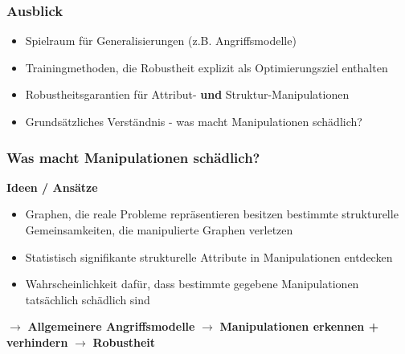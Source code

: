 \documentclass{beamer}
\begin{document}
\begin{frame}
  \frametitle{Ausblick}

  \begin{itemize}
    \item Spielraum für Generalisierungen (z.B. Angriffsmodelle)
    \item Trainingmethoden, die Robustheit explizit als Optimierungsziel enthalten
    \item Robustheitsgarantien für Attribut- \textbf{und} Struktur-Manipulationen
    \item Grundsätzliches Verständnis - was macht Manipulationen schädlich?
  \end{itemize}
\end{frame}

\begin{frame}
  \frametitle{Was macht Manipulationen schädlich?}

  \textbf{Ideen / Ansätze}
  \begin{itemize}
    \item Graphen, die reale Probleme repräsentieren besitzen bestimmte strukturelle Gemeinsamkeiten, die manipulierte Graphen verletzen
    \item Statistisch signifikante strukturelle Attribute in Manipulationen entdecken
    \item Wahrscheinlichkeit dafür, dass bestimmte gegebene Manipulationen tatsächlich schädlich sind
  \end{itemize}

  $\rightarrow$ \textbf{Allgemeinere Angriffsmodelle}\newline
  $\rightarrow$ \textbf{Manipulationen erkennen + verhindern}\newline
  $\rightarrow$ \textbf{Robustheit}\newline

\end{frame}

\begin{frame}[allowframebreaks]
  
  
\end{frame}
\end{document}
